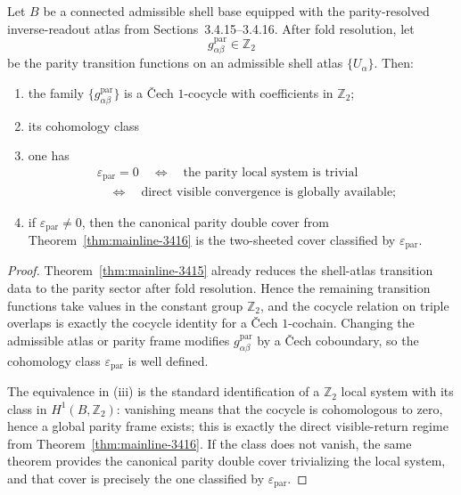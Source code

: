 \begin{theorem}
\label{thm:mainline-3417}
Let $B$ be a connected admissible shell base equipped with the parity-resolved inverse-readout atlas from Sections~3.4.15--3.4.16. After fold resolution, let
\[
  g^{\mathrm{par}}_{\alpha\beta}\in \mathbb Z_2
\]
be the parity transition functions on an admissible shell atlas $\{U_\alpha\}$. Then:
\begin{enumerate}[label=(\roman*)]
  \item the family $\{g^{\mathrm{par}}_{\alpha\beta}\}$ is a \v{C}ech $1$-cocycle with coefficients in $\mathbb Z_2$;
  \item its cohomology class
  \item one has
  \[
  \begin{aligned}
    &\varepsilon_{\mathrm{par}}=0
    \quad\Longleftrightarrow\quad
    \text{the parity local system is trivial}\\[0.2em]
    &\quad\Longleftrightarrow\quad
    \text{direct visible convergence is globally available};
  \end{aligned}
  \]
  \item if $\varepsilon_{\mathrm{par}}\neq 0$, then the canonical parity double cover from Theorem~\ref{thm:mainline-3416} is the two-sheeted cover classified by $\varepsilon_{\mathrm{par}}$.
\end{enumerate}
\end{theorem}

\begin{proof}
Theorem~\ref{thm:mainline-3415} already reduces the shell-atlas transition data to the parity sector after fold resolution. Hence the remaining transition functions take values in the constant group $\mathbb Z_2$, and the cocycle relation on triple overlaps is exactly the cocycle identity for a \v{C}ech $1$-cochain. Changing the admissible atlas or parity frame modifies $g^{\mathrm{par}}_{\alpha\beta}$ by a \v{C}ech coboundary, so the cohomology class $\varepsilon_{\mathrm{par}}$ is well defined.

The equivalence in (iii) is the standard identification of a $\mathbb Z_2$ local system with its class in $H^1(B,\mathbb Z_2)$: vanishing means that the cocycle is cohomologous to zero, hence a global parity frame exists; this is exactly the direct visible-return regime from Theorem~\ref{thm:mainline-3416}. If the class does not vanish, the same theorem provides the canonical parity double cover trivializing the local system, and that cover is precisely the one classified by $\varepsilon_{\mathrm{par}}$.
\end{proof}

